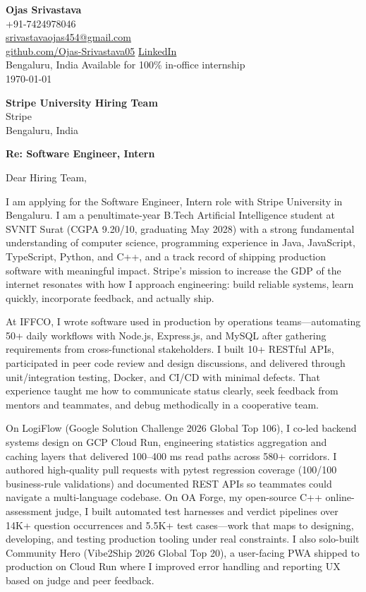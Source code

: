 \documentclass[a4paper,11pt]{article}
\begin{document}
\begin{flushright}
\textbf{Ojas Srivastava} \\
+91-7424978046 \\
\href{mailto:srivastavaojas454@gmail.com}{srivastavaojas454@gmail.com} \\
\href{https://github.com/Ojas-Srivastava05}{github.com/Ojas-Srivastava05} \textbar{}
\href{https://linkedin.com/in/ojas-srivastava05}{LinkedIn} \\
Bengaluru, India \textbar{} Available for 100\% in-office internship \\
\today
\end{flushright}

\vspace{4mm}
\textbf{Stripe University Hiring Team} \\
Stripe \\
Bengaluru, India

\vspace{2mm}
\textbf{Re: Software Engineer, Intern}

Dear Hiring Team,

I am applying for the Software Engineer, Intern role with Stripe University in Bengaluru. I am a penultimate-year B.Tech Artificial Intelligence student at SVNIT Surat (CGPA 9.20/10, graduating May 2028) with a strong fundamental understanding of computer science, programming experience in Java, JavaScript, TypeScript, Python, and C++, and a track record of shipping production software with meaningful impact. Stripe's mission to increase the GDP of the internet resonates with how I approach engineering: build reliable systems, learn quickly, incorporate feedback, and actually ship.

At IFFCO, I wrote software used in production by operations teams---automating 50+ daily workflows with Node.js, Express.js, and MySQL after gathering requirements from cross-functional stakeholders. I built 10+ RESTful APIs, participated in peer code review and design discussions, and delivered through unit/integration testing, Docker, and CI/CD with minimal defects. That experience taught me how to communicate status clearly, seek feedback from mentors and teammates, and debug methodically in a cooperative team.

On LogiFlow (Google Solution Challenge 2026 Global Top 106), I co-led backend systems design on GCP Cloud Run, engineering statistics aggregation and caching layers that delivered 100--400 ms read paths across 580+ corridors. I authored high-quality pull requests with pytest regression coverage (100/100 business-rule validations) and documented REST APIs so teammates could navigate a multi-language codebase. On OA Forge, my open-source C++ online-assessment judge, I built automated test harnesses and verdict pipelines over 14K+ question occurrences and 5.5K+ test cases---work that maps to designing, developing, and testing production tooling under real constraints. I also solo-built Community Hero (Vibe2Ship 2026 Global Top 20), a user-facing PWA shipped to production on Cloud Run where I improved error handling and reporting UX based on judge and peer feedback.
\end{document}
